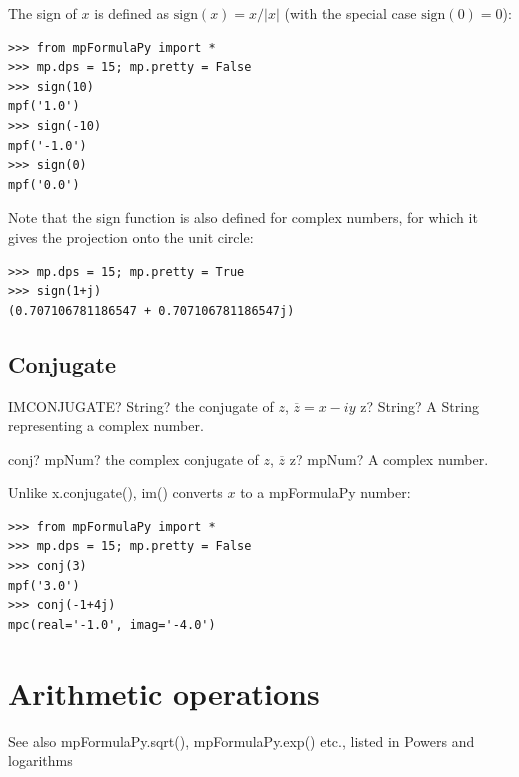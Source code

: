 The sign of $x$ is defined as $\text{sign}(x)=x/|x|$ (with the special case $\text{sign}(0)=0$):

\begin{lstlisting}
>>> from mpFormulaPy import *
>>> mp.dps = 15; mp.pretty = False
>>> sign(10)
mpf('1.0')
>>> sign(-10)
mpf('-1.0')
>>> sign(0)
mpf('0.0')
\end{lstlisting}


Note that the sign function is also defined for complex numbers, for which it gives the projection onto the unit circle:

\begin{lstlisting}
>>> mp.dps = 15; mp.pretty = True
>>> sign(1+j)
(0.707106781186547 + 0.707106781186547j)
\end{lstlisting}


\subsection{Conjugate}

\begin{mpFunctionsExtract}
	\mpWorksheetFunctionOneNotImplemented
	{IMCONJUGATE? String? the conjugate of $z$, $\overline{z}=x-iy$}
	{z? String? A String representing a complex number.}
\end{mpFunctionsExtract}

\vspace{0.6cm}

\begin{mpFunctionsExtract}
	\mpFunctionOne
	{conj? mpNum? the complex conjugate of $z$, $\overline{z}$}
	{z? mpNum? A complex number.}
\end{mpFunctionsExtract}

Unlike x.conjugate(), im() converts $x$ to a mpFormulaPy number:

\begin{lstlisting}
>>> from mpFormulaPy import *
>>> mp.dps = 15; mp.pretty = False
>>> conj(3)
mpf('3.0')
>>> conj(-1+4j)
mpc(real='-1.0', imag='-4.0')
\end{lstlisting}



\newpage
\section{Arithmetic operations}

See also mpFormulaPy.sqrt(), mpFormulaPy.exp() etc., listed in Powers and logarithms


